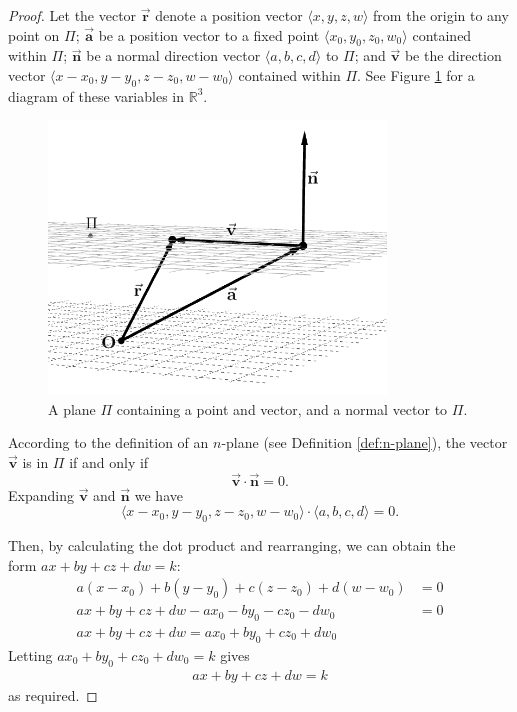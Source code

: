 \begin{proof}
    Let the vector $\Vec{\mathbf{r}}$ denote a position vector $\langle x, y, z, w\rangle$ from the origin to any point on $\Pi$; $\Vec{\mathbf{a}}$ be a position vector to a fixed point $\langle x_0, y_0, z_0, w_0\rangle$ contained within $\Pi$; $\Vec{\mathbf{n}}$ be a normal direction vector $\langle a, b, c, d\rangle$ to $\Pi$; and $\Vec{\mathbf{v}}$ be the direction vector $\langle x-x_0, y-y_0, z-z_0, w-w_0\rangle$ contained within $\Pi$. See Figure \ref{fig:plane equation proof setup} for a diagram of these variables in $\mathbb{R}^3$.
    \begin{figure}[H]
        \centering
        \includegraphics[width=0.8\textwidth]{images/vector equation of plane.png}
        \caption{A plane $\Pi$ containing a point and vector, and a normal vector to $\Pi$.}
        \label{fig:plane equation proof setup}
    \end{figure}
    
    \noindent
    According to the definition of an $n$-plane (see Definition \ref{def:n-plane}), the vector $\Vec{\mathbf{v}}$ is in $\Pi$ if and only if $$\Vec{\mathbf{v}} \cdot \Vec{\mathbf{n}} = 0.$$ Expanding $\Vec{\mathbf{v}}$ and $\Vec{\mathbf{n}}$ we have $$\langle x-x_0, y-y_0, z-z_0, w-w_0\rangle \cdot \langle a, b, c, d\rangle = 0.$$
    
    \noindent
    Then, by calculating the dot product and rearranging, we can obtain the \\form $ax+by+cz+dw=k$:
    \begin{align*}
        a(x-x_0)+b(y-y_0)+c(z-z_0)+d(w-w_0) &= 0\\
        ax+by+cz+dw-ax_0-by_0-cz_0-dw_0 &= 0\\
        ax+by+cz+dw = ax_0+by_0+cz_0+dw_0
    \end{align*}
    Letting $ax_0+by_0+cz_0+dw_0=k$ gives
    \begin{align*}
        ax+by+cz+dw = k
    \end{align*}
    as required.
\end{proof}

